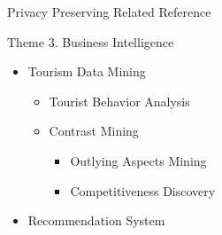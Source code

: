 \documentclass[
 size=14pt,
 paper=smartboard,  %
 mode=present, 		%
 display=slides, 	%
 pauseslide,
 fleqn,leqno]{powerdot}{}
\begin{document}
\begin{slide}[toc=,bm=]{Privacy Preserving Related Reference}
\end{slide}




\begin{slide}{Theme 3. Business Intelligence}


\begin{itemize}
\item
Tourism Data Mining

\begin{itemize}
\item
Tourist Behavior Analysis

\item
Contrast Mining

\begin{itemize}

\item
Outlying Aspects Mining

\item
Competitiveness Discovery

\end{itemize}

\end{itemize}

\item
Recommendation System

\end{itemize}

\end{slide}
\end{document}
